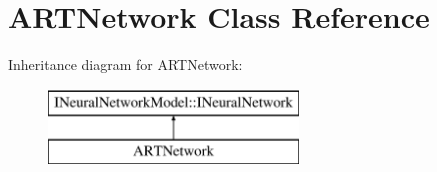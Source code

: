 \hypertarget{class_a_r_t_network}{}\section{A\+R\+T\+Network Class Reference}
\label{class_a_r_t_network}
Inheritance diagram for A\+R\+T\+Network\+:\begin{figure}[H]
\begin{center}
\leavevmode
\includegraphics[height=2.000000cm]{class_a_r_t_network}
\end{center}
\end{figure}
